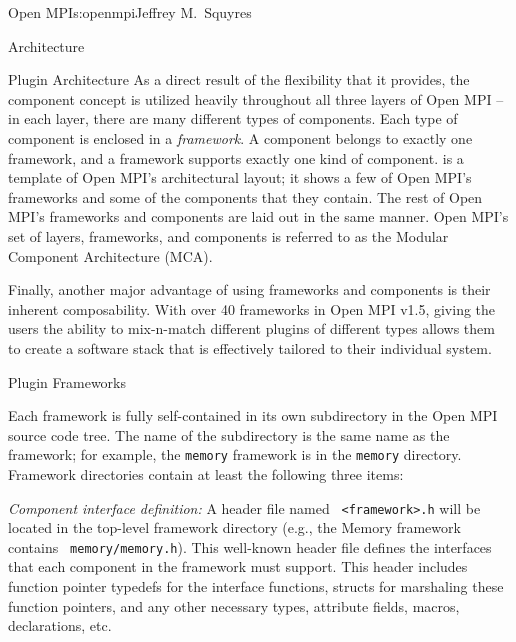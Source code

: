 \begin{aosachapter}{Open MPI}{s:openmpi}{Jeffrey M.\ Squyres}
\begin{aosasect1}{Architecture}
\begin{aosasect2}{Plugin Architecture}
As a direct result of the flexibility that it provides, the component
concept is utilized heavily throughout all three layers of Open MPI --
in each layer, there are many different types of components.
%
Each type of component is enclosed in a {\em framework}.
%
A component belongs to exactly one framework, and a framework supports
exactly one kind of component.
%
 is a template of Open MPI's architectural
layout; it shows a few of Open MPI's frameworks and some of the
components that they contain.  The rest of Open MPI's frameworks and
components are laid out in the same manner.
%
Open MPI's set of layers, frameworks, and components is referred to as
the Modular Component Architecture (MCA).


Finally, another major advantage of using frameworks and components is
their inherent composability.  With over 40 frameworks in Open MPI
v1.5, giving the users the ability to mix-n-match different plugins of
different types allows them to create a software stack that is
effectively tailored to their individual system.

\end{aosasect2}


\begin{aosasect2}{Plugin Frameworks}

Each framework is fully self-contained in its own subdirectory in the
Open MPI source code tree.  The name of the subdirectory is the same
name as the framework; for example, the {\tt memory} framework is in
the {\tt memory} directory.  
%
Framework directories contain at least the following three items:

\begin{aosaenumerate}
\item {\em Component interface definition:} A header file named {\tt
    <framework>.h} will be located in the top-level framework
  directory (e.g., the Memory framework contains {\tt
    memory/memory.h}).  This well-known header file defines the
  interfaces that each component in the framework must support.  This
  header includes function pointer typedefs for the interface
  functions, structs for marshaling these function pointers, and any
  other necessary types, attribute fields, macros, declarations, etc.


\end{aosaenumerate}
\end{aosasect2}
\end{aosasect1}
\end{aosachapter}
